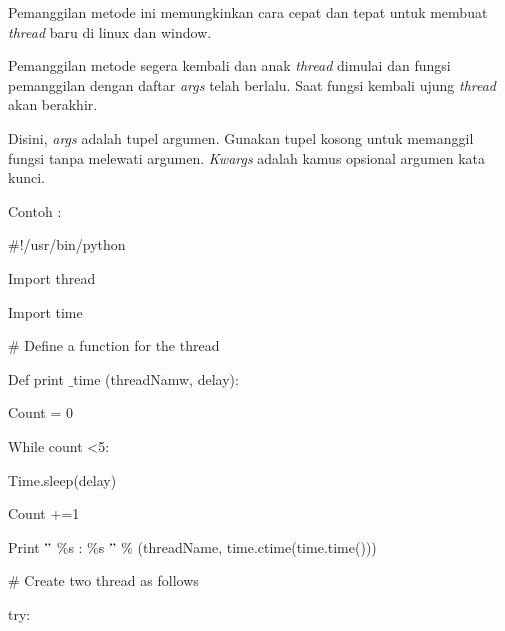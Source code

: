 \documentclass[a4paper,12pt]{report}
\begin{document}
\vspace{12pt}
Pemanggilan metode ini memungkinkan cara cepat dan tepat untuk membuat \textit{thread} baru di linux dan window. \par
Pemanggilan metode segera kembali dan anak  \textit{thread} dimulai dan fungsi pemanggilan dengan daftar \textit{args} telah berlalu. Saat fungsi kembali ujung \textit{thread} akan berakhir.   \par
Disini, \textit{args }adalah tupel argumen. Gunakan tupel kosong untuk memanggil fungsi tanpa melewati argumen. \textit{Kwargs} adalah kamus opsional argumen kata kunci.  \par
\noindent 
  \par
\noindent 
Contoh : \par
\noindent 
{\fontsize{10pt}{10pt}\selectfont  $  \#  $!/usr/bin/python} \par
\vspace{10pt}
\noindent 
{\fontsize{10pt}{10pt}\selectfont Import thread} \par
\noindent 
{\fontsize{10pt}{10pt}\selectfont Import time} \par
\vspace{10pt}
\noindent 
{\fontsize{10pt}{10pt}\selectfont  $  \#  $ Define a function for the thread} \par
\noindent 
{\fontsize{10pt}{10pt}\selectfont Def print $  \_  $time (threadNamw, delay):} \par
\noindent 
{\fontsize{10pt}{10pt}\selectfont  \hspace*{0.5in} Count = 0} \par
\noindent 
{\fontsize{10pt}{10pt}\selectfont  \hspace*{0.5in} While count <5:} \par
\noindent 
{\fontsize{10pt}{10pt}\selectfont  \hspace*{0.5in} Time.sleep(delay)} \par
\noindent 
{\fontsize{10pt}{10pt}\selectfont  \hspace*{0.5in} Count +=1} \par
\noindent 
{\fontsize{10pt}{10pt}\selectfont  \hspace*{0.5in} Print  $ " $ $  \%  $s :  $  \%  $s $ " $  $  \%  $ (threadName, time.ctime(time.time()))} \par
\vspace{10pt}
\noindent 
{\fontsize{10pt}{10pt}\selectfont  $  \#  $ Create two thread as follows} \par
\noindent 
{\fontsize{10pt}{10pt}\selectfont try:} \par
\end{document}
